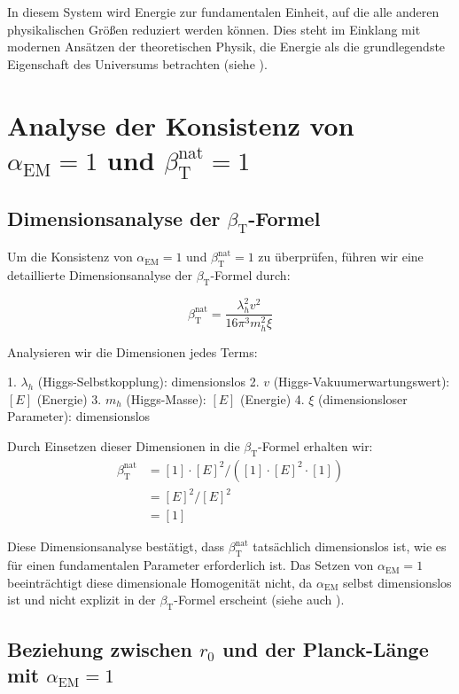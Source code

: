 \documentclass[12pt,a4paper]{article}
\newcommand{\alphaEM}{\alpha_{\text{EM}}}
\newcommand{\betaT}{\beta_{\text{T}}}
\begin{document}
	In diesem System wird Energie zur fundamentalen Einheit, auf die alle anderen physikalischen Größen reduziert werden können. Dies steht im Einklang mit modernen Ansätzen der theoretischen Physik, die Energie als die grundlegendste Eigenschaft des Universums betrachten (siehe \cite{pascher_zeit_masse_2025}).
	
	\section{Analyse der Konsistenz von \(\alphaEM = 1\) und \(\betaT^{\text{nat}} = 1\)}
	\label{sec:consistency}
	
	\subsection{Dimensionsanalyse der \(\betaT\)-Formel}
	\label{subsec:dimensional_analysis}
	
	Um die Konsistenz von \(\alphaEM = 1\) und \(\betaT^{\text{nat}} = 1\) zu überprüfen, führen wir eine detaillierte Dimensionsanalyse der \(\betaT\)-Formel durch:
	
	\begin{equation}
		\betaT^{\text{nat}} = \frac{\lambda_h^2 v^2}{16\pi^3 m_h^2 \xi}
	\end{equation}
	
	Analysieren wir die Dimensionen jedes Terms:
	
	1. \(\lambda_h\) (Higgs-Selbstkopplung): dimensionslos
	2. \(v\) (Higgs-Vakuumerwartungswert): \([E]\) (Energie)
	3. \(m_h\) (Higgs-Masse): \([E]\) (Energie)
	4. \(\xi\) (dimensionsloser Parameter): dimensionslos
	
	Durch Einsetzen dieser Dimensionen in die \(\betaT\)-Formel erhalten wir:
	\begin{align}
		\betaT^{\text{nat}} &= [1] \cdot [E]^2 / ([1] \cdot [E]^2 \cdot [1]) \\
		&= [E]^2 / [E]^2 \\
		&= [1]
	\end{align}
	
	Diese Dimensionsanalyse bestätigt, dass \(\betaT^{\text{nat}}\) tatsächlich dimensionslos ist, wie es für einen fundamentalen Parameter erforderlich ist. Das Setzen von \(\alphaEM = 1\) beeinträchtigt diese dimensionale Homogenität nicht, da \(\alphaEM\) selbst dimensionslos ist und nicht explizit in der \(\betaT\)-Formel erscheint (siehe auch \cite{pascher_params_2025}).
	
	\subsection{Beziehung zwischen \(r_0\) und der Planck-Länge mit \(\alphaEM = 1\)}
	\label{subsec:r0_planck}
	
\end{document}
